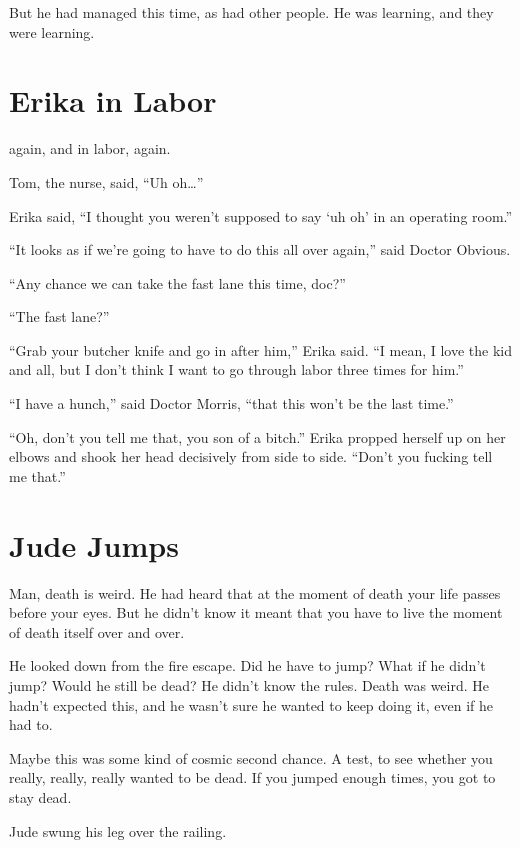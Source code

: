 But he had managed this time, as had other people. He was learning, and they were learning.



\section{Erika in Labor}

 again, and in labor, again.

Tom, the nurse, said, “Uh oh…”

Erika said, “I thought you weren’t supposed to say `uh oh’ in an operating room.”

“It looks as if we’re going to have to do this all over again,” said Doctor Obvious.

“Any chance we can take the fast lane this time, doc?”

“The fast lane?”

“Grab your butcher knife and go in after him,” Erika said. “I mean, I love the kid and all, but I don’t think I want to go through labor three times for him.”

“I have a hunch,” said Doctor Morris, “that this won’t be the last time.”

“Oh, don’t you tell me that, you son of a bitch.” Erika propped herself up on her elbows and shook her head decisively from side to side. “Don’t you fucking tell me that.”



\section{Jude Jumps}

 Man, death is weird. He had heard that at the moment of death your life passes before your eyes. But he didn’t know it meant that you have to live the moment of death itself over and over.

He looked down from the fire escape. Did he have to jump? What if he didn’t jump? Would he still be dead? He didn’t know the rules. Death was weird. He hadn’t expected this, and he wasn’t sure he wanted to keep doing it, even if he had to.

Maybe this was some kind of cosmic second chance. A test, to see whether you really, really, really wanted to be dead. If you jumped enough times, you got to stay dead.

Jude swung his leg over the railing.

